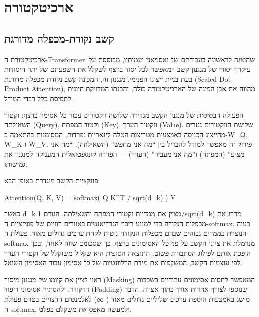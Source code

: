 \hypertarget{ux5d0ux5e8ux5dbux5d9ux5d8ux5e7ux5d8ux5d5ux5e8ux5d4}{%
\section{ארכיטקטורה}\label{ux5d0ux5e8ux5dbux5d9ux5d8ux5e7ux5d8ux5d5ux5e8ux5d4}}

\hypertarget{ux5e7ux5e9ux5d1-ux5e0ux5e7ux5d5ux5d3ux5ea-ux5deux5dbux5e4ux5dcux5d4-ux5deux5d3ux5d5ux5e8ux5d2ux5ea}{%
\subsection{קשב נקודת-מכפלה
מדורגת}\label{ux5e7ux5e9ux5d1-ux5e0ux5e7ux5d5ux5d3ux5ea-ux5deux5dbux5e4ux5dcux5d4-ux5deux5d3ux5d5ux5e8ux5d2ux5ea}}

ארכיטקטורת ה-Transformer, שהוצגה לראשונה בעבודתם של ואסמאני ועמיתיו,
מבוססת על עיקרון יסודי של מנגנון קשב המאפשר לכל יסוד ברצף לשקלל את
השפעתם של יתר היסודות בעת בניית ייצוגו הפנימי. מנגנון זה, המכונה קשב
נקודת-מכפלה מדורגת (Scaled Dot-Product Attention), מהווה את אבן הפינה של
הארכיטקטורה כולה, והבנתו המדויקת חיונית לתפיסת כלל רבדי המודל.

הפעולה הבסיסית של מנגנון הקשב מגדירה שלושה ווקטורים עבור כל אסימון ברצף:
וקטור השאילתה (Query), וקטור המפתח (Key), ווקטור הערך (Value). שלושת
הווקטורים נגזרים מהייצוג הכניסה באמצעות מטריצות הטלה לינאריות נפרדות,
המסומנות בהתאמה כ-W\_Q, W\_K ו-W\_V. פירוק זה מאפשר למודל להבדיל בין
``מה אני מחפש'' (השאילתה), ``מה אני מציע'' (המפתח) ו''מה אני מעביר''
(הערך) --- הפרדה קונספטואלית המעניקה למנגנון את גמישותו.

פונקציית הקשב מוגדרת באופן הבא:

Attention(Q, K, V) = softmax( Q K\^{}T / sqrt(d\_k) ) V

כאשר d\_k מציין את ממדיות וקטורי המפתח והשאילתה. הגורם 1/sqrt(d\_k) מדרג
את מכפלות הנקודה כדי למנוע ריכוז הגרדיאנטים באזורים רוויים של פונקציית
ה-softmax, בעיה הנוצרת בממדים גבוהים שבהם מכפלות הנקודה נוטות לקחת ערכים
גדולים מאוד. פעולת ה-softmax מנרמלת את ציוני הקשב על פני כל האסימונים
ברצף, כך שסכומם שווה לאחד, ובכך הופכת אותם לפילוג הסתברות פשוט. התוצאה
הסופית היא שקלול משוקלל של וקטורי הערך לפי עוצמות הקשב, המשקפות את מידת
הרלוונטיות של כל אסימון עבור האסימון השואל.

ראוי לציין את קיומו של מנגנון מיסוך (Masking) המאפשר לחסום אסימונים
עתידיים בשכבות הדקודר, ולהסתיר אסימוני ריפוד (Padding) שנוספו לצורך
אחדות אורך בתוך אצווה. הדבר מושג באמצעות הוספת ערכים שליליים גדולים מאוד
(-∞) לאלמנטים הרצויים בטרם פעולת ה-softmax, ולמעשה מאפס את משקלם בפלט.

